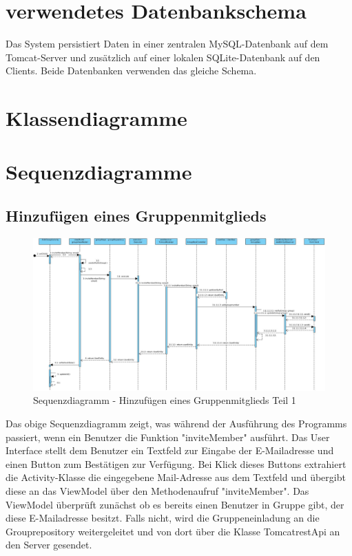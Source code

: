 


\section{verwendetes Datenbankschema}
Das System persistiert Daten in einer zentralen MySQL-Datenbank auf dem Tomcat-Server und zusätzlich auf einer lokalen SQLite-Datenbank auf den Clients. Beide Datenbanken verwenden das gleiche Schema.\\


\section{Klassendiagramme}

\section{Sequenzdiagramme}

\subsection{Hinzufügen eines Gruppenmitglieds}

\begin{figure}[H]
	\centering
	\includegraphics[width=1\textwidth]{../Sequenzdiagramme/addGroupMember.jpg}
	\caption{Sequenzdiagramm - Hinzufügen eines Gruppenmitglieds Teil 1}
\end{figure}

Das obige Sequenzdiagramm zeigt, was während der Ausführung des Programms passiert, wenn ein Benutzer die Funktion "inviteMember" ausführt. Das User Interface stellt dem Benutzer ein Textfeld zur Eingabe der E-Mailadresse und einen Button zum Bestätigen zur Verfügung. Bei Klick dieses Buttons extrahiert die Activity-Klasse die eingegebene Mail-Adresse aus dem Textfeld und übergibt diese an das ViewModel über den Methodenaufruf "inviteMember". Das ViewModel überprüft zunächst ob es bereits einen Benutzer in Gruppe gibt, der diese E-Mailadresse besitzt. Falls nicht, wird die Gruppeneinladung an die Grouprepository weitergeleitet und von dort über die Klasse TomcatrestApi an den Server gesendet.

